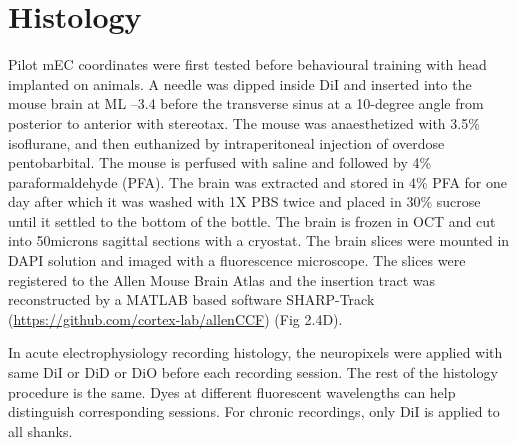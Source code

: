 \section{Histology}
Pilot mEC coordinates were first tested before behavioural training with head implanted on animals. A needle was dipped inside DiI and inserted into the mouse brain at ML –3.4 before the transverse sinus at a 10-degree angle from posterior to anterior with stereotax. The mouse was anaesthetized with 3.5\% isoflurane, and then euthanized by intraperitoneal injection of overdose pentobarbital. The mouse is perfused with saline and followed by 4\% paraformaldehyde (PFA). The brain was extracted and stored in 4\% PFA for one day after which it was washed with 1X PBS twice and placed in 30\% sucrose until it settled to the bottom of the bottle. The brain is frozen in OCT and cut into 50microns sagittal sections with a cryostat. The brain slices were mounted in DAPI solution and imaged with a fluorescence microscope. The slices were registered to the Allen Mouse Brain Atlas and the insertion tract was reconstructed by a MATLAB based software SHARP-Track (\href{https://github.com/cortex-lab/allenCCF}{https://github.com/cortex-lab/allenCCF}) (Fig 2.4D).

 In acute electrophysiology recording histology, the neuropixels were applied with same DiI or DiD or DiO before each recording session. The rest of the histology procedure is the same. Dyes at different fluorescent wavelengths can help distinguish corresponding sessions. For chronic recordings, only DiI is applied to all shanks.
